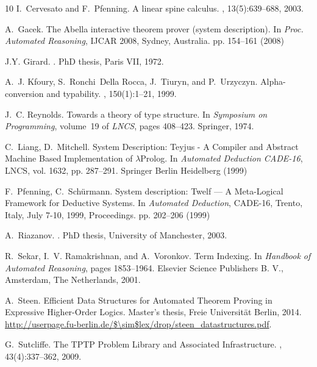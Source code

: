 \documentclass{llncs}
\begin{document}
\begin{thebibliography}{10}
I.~Cervesato and F.~Pfenning.
\newblock A linear spine calculus.
, 13(5):639--688, 2003.

A.~Gacek. 
\newblock The Abella interactive theorem prover (system description). 
\newblock In {\em Proc. Automated Reasoning}, IJCAR 2008, Sydney, Australia. pp. 154–161 (2008)

J.Y. Girard.
.
\newblock PhD thesis, Paris VII, 1972.

A.~J. Kfoury, S.~Ronchi~Della Rocca, J.~Tiuryn, and P.~Urzyczyn.
\newblock Alpha-conversion and typability.
, 150(1):1--21, 1999.

J.~C. Reynolds.
\newblock Towards a theory of type structure.
\newblock In {\em Symposium on Programming}, volume~19 of {\em LNCS}, pages
  408--423. Springer, 1974.

C.~Liang, D.~Mitchell.
\newblock System Description: Teyjus - A Compiler and Abstract Machine Based Implementation of $\lambda$Prolog.
\newblock In {\em Automated Deduction CADE-16}, LNCS, vol. 1632, pp. 287--291. Springer Berlin Heidelberg (1999)

F.~Pfenning, C.~Sch\"urmann.
\newblock System description: Twelf --- A Meta-Logical Framework for Deductive Systems. 
\newblock In {\em Automated Deduction}, CADE-16, Trento, Italy, July 7-10, 1999, Proceedings. pp. 202–206 (1999)

A.~Riazanov.
.
\newblock PhD thesis, University of Manchester, 2003.

R.~Sekar, I.~V. Ramakrishnan, and A.~Voronkov.
\newblock Term Indexing.
\newblock In {\em Handbook of Automated Reasoning}, pages 1853--1964. Elsevier
  Science Publishers B. V., Amsterdam, The Netherlands, 2001.

A.~Steen.
\newblock Efficient Data Structures for Automated Theorem Proving in Expressive
  Higher-Order Logics.
\newblock Master's thesis, Freie Universit\"at Berlin, 2014.
\newblock
  \url{http://userpage.fu-berlin.de/$\sim$lex/drop/steen\_datastructures.pdf}.

G.~Sutcliffe.
\newblock The {TPTP} Problem Library and Associated Infrastructure.
, 43(4):337--362, 2009.


\end{thebibliography}
\end{document}
